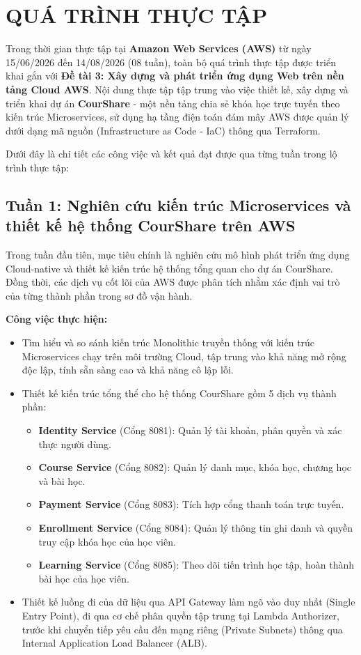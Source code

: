 \section{QUÁ TRÌNH THỰC TẬP}

Trong thời gian thực tập tại \textbf{Amazon Web Services (AWS)} từ ngày 15/06/2026 đến 14/08/2026 (08 tuần), toàn bộ quá trình thực tập được triển khai gắn với \textbf{Đề tài 3: Xây dựng và phát triển ứng dụng Web trên nền tảng Cloud AWS}. Nội dung thực tập tập trung vào việc thiết kế, xây dựng và triển khai dự án \textbf{CourShare} - một nền tảng chia sẻ khóa học trực tuyến theo kiến trúc Microservices, sử dụng hạ tầng điện toán đám mây AWS được quản lý dưới dạng mã nguồn (Infrastructure as Code - IaC) thông qua Terraform.

Dưới đây là chi tiết các công việc và kết quả đạt được qua từng tuần trong lộ trình thực tập:

\subsection{Tuần 1: Nghiên cứu kiến trúc Microservices và thiết kế hệ thống CourShare trên AWS}

Trong tuần đầu tiên, mục tiêu chính là nghiên cứu mô hình phát triển ứng dụng Cloud-native và thiết kế kiến trúc hệ thống tổng quan cho dự án CourShare. Đồng thời, các dịch vụ cốt lõi của AWS được phân tích nhằm xác định vai trò của từng thành phần trong sơ đồ vận hành.

\textbf{Công việc thực hiện:}
\begin{itemize}
    \item Tìm hiểu và so sánh kiến trúc Monolithic truyền thống với kiến trúc Microservices chạy trên môi trường Cloud, tập trung vào khả năng mở rộng độc lập, tính sẵn sàng cao và khả năng cô lập lỗi.
    \item Thiết kế kiến trúc tổng thể cho hệ thống CourShare gồm 5 dịch vụ thành phần:
    \begin{itemize}
        \item \textbf{Identity Service} (Cổng 8081): Quản lý tài khoản, phân quyền và xác thực người dùng.
        \item \textbf{Course Service} (Cổng 8082): Quản lý danh mục, khóa học, chương học và bài học.
        \item \textbf{Payment Service} (Cổng 8083): Tích hợp cổng thanh toán trực tuyến.
        \item \textbf{Enrollment Service} (Cổng 8084): Quản lý thông tin ghi danh và quyền truy cập khóa học của học viên.
        \item \textbf{Learning Service} (Cổng 8085): Theo dõi tiến trình học tập, hoàn thành bài học của học viên.
    \end{itemize}
    \item Thiết kế luồng đi của dữ liệu qua API Gateway làm ngõ vào duy nhất (Single Entry Point), đi qua cơ chế phân quyền tập trung tại Lambda Authorizer, trước khi chuyển tiếp yêu cầu đến mạng riêng (Private Subnets) thông qua Internal Application Load Balancer (ALB).
\end{itemize}

